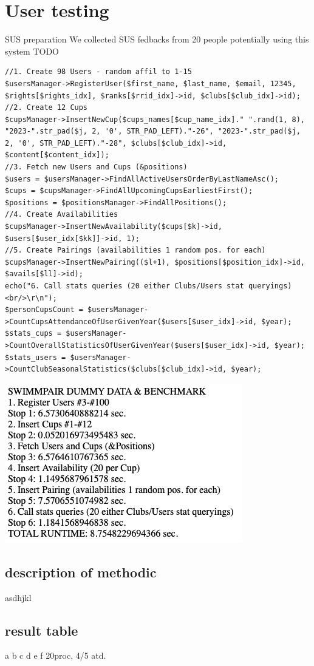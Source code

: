 \section{User testing}
SUS preparation
\newline
We collected SUS fedbacks from 20 people potentially using this system
\newline
TODO
\begin{lstlisting}
//1. Create 98 Users - random affil to 1-15
$usersManager->RegisterUser($first_name, $last_name, $email, 12345, $rights[$rights_idx], $ranks[$rrid_idx]->id, $clubs[$club_idx]->id);
//2. Create 12 Cups
$cupsManager->InsertNewCup($cups_names[$cup_name_idx]." ".rand(1, 8), "2023-".str_pad($j, 2, '0', STR_PAD_LEFT)."-26", "2023-".str_pad($j, 2, '0', STR_PAD_LEFT)."-28", $clubs[$club_idx]->id, $content[$content_idx]);
//3. Fetch new Users and Cups (&positions)
$users = $usersManager->FindAllActiveUsersOrderByLastNameAsc();
$cups = $cupsManager->FindAllUpcomingCupsEarliestFirst();
$positions = $positionsManager->FindAllPositions();
//4. Create Availabilities
$cupsManager->InsertNewAvailability($cups[$k]->id, $users[$user_idx[$kk]]->id, 1);
//5. Create Pairings (availabilities 1 random pos. for each)
$cupsManager->InsertNewPairing(($l+1), $positions[$position_idx]->id, $avails[$ll]->id);
echo("6. Call stats queries (20 either Clubs/Users stat queryings)<br/>\r\n");
$personCupsCount = $usersManager->CountCupsAttendanceOfUserGivenYear($users[$user_idx]->id, $year);
$stats_cups = $usersManager->CountOverallStatisticsOfUserGivenYear($users[$user_idx]->id, $year);
$stats_users = $usersManager->CountClubSeasonalStatistics($clubs[$club_idx]->id, $year);

\end{lstlisting}
\includegraphics[scale=0.707]{img/app-benchmarking.png}

\subsection{description of methodic}
asdhjkl
\subsection{result table}
a b c d e f 20proc, 4/5 atd.
